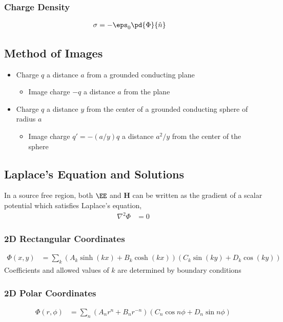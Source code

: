 \documentclass[11pt]{article}
\renewcommand{\HH}{\mathbf{H}}
\begin{document}
\subsubsection{Charge Density}
\label{sec:org8b81383}
\begin{align*}
\sigma & = -\eps_0 \pd{\Phi}{\hat{n}}
\end{align*}

\subsection{Method of Images}
\label{sec:orgb6d2f94}
\begin{itemize}
\item Charge \(q\) a distance \(a\) from a grounded conducting plane
\begin{itemize}
\item Image charge \(-q\) a distance \(a\) from the plane
\end{itemize}
\item Charge \(q\) a distance \(y\) from the center of a grounded conducting sphere of radius \(a\)
\begin{itemize}
\item Image charge \(q' = -(a/y) q\) a distance \(a^2/y\) from the center of the sphere
\end{itemize}
\end{itemize}

\subsection{Laplace's Equation and Solutions}
\label{sec:org7893e9f}
In a source free region, both \(\EE\) and \(\HH\) can be written as the gradient of a scalar potential which satisfies Laplace's equation,
\begin{align*}
\nabla^2 \Phi & = 0
\end{align*}
\subsubsection{2D Rectangular Coordinates}
\label{sec:org8afc401}
\begin{align*}
\Phi(x,y) & = \sum_k (A_k \sinh(kx) + B_k \cosh(kx)) (C_k \sin(ky) + D_k \cos(ky))
\end{align*}
Coefficients and allowed values of \(k\) are determined by boundary conditions
\subsubsection{2D Polar Coordinates}
\label{sec:orgf37f899}
\begin{align*}
\Phi(r, \phi) & = \sum_n (A_n r^n + B_n r^{-n}) (C_n \cos n\phi + D_n \sin n\phi)
\end{align*}
\end{document}
